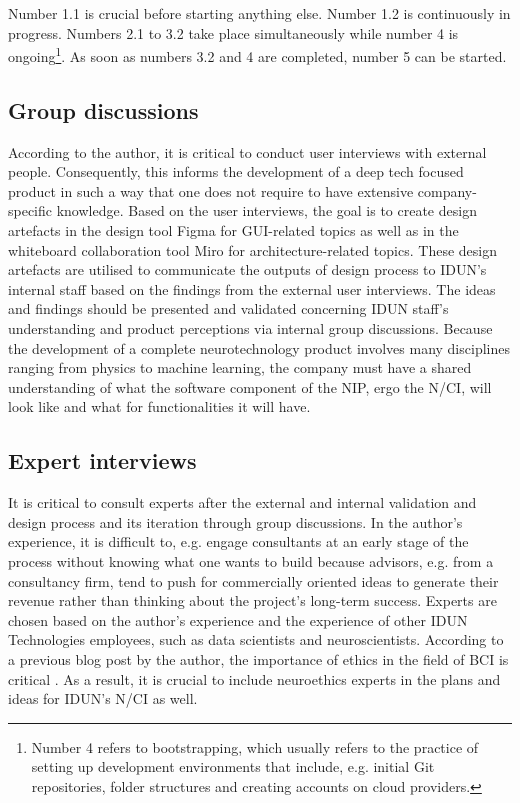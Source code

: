 Number 1.1 is crucial before starting anything else. Number 1.2 is continuously in progress. Numbers 2.1 to 3.2 take place simultaneously while number 4 is ongoing\footnote{Number 4 refers to bootstrapping, which usually refers to the practice of setting up development environments that include, e.g. initial Git repositories, folder structures and creating accounts on cloud providers.}. As soon as numbers 3.2 and 4 are completed, number 5 can be started.

\subsection{Group discussions}
\label{chapter3-group-discussions}

According to the author, it is critical to conduct user interviews with external people. Consequently, this informs the development of a deep tech focused product in such a way that one does not require to have extensive company-specific knowledge. Based on the user interviews, the goal is to create design artefacts in the design tool Figma for GUI-related topics as well as in the whiteboard collaboration tool Miro for architecture-related topics. These design artefacts are utilised to communicate the outputs of design process to IDUN's internal staff based on the findings from the external user interviews. The ideas and findings should be presented and validated concerning IDUN staff's understanding and product perceptions via internal group discussions. Because the development of a complete neurotechnology product involves many disciplines ranging from physics to machine learning, the company must have a shared understanding of what the software component of the NIP, ergo the N/CI, will look like and what for functionalities it will have.

\subsection{Expert interviews}
\label{chapter3-expert-interviews}

It is critical to consult experts after the external and internal validation and design process and its iteration through group discussions. In the author's experience, it is difficult to, e.g. engage consultants at an early stage of the process without knowing what one wants to build because advisors, e.g. from a consultancy firm, tend to push for commercially oriented ideas to generate their revenue rather than thinking about the project's long-term success. Experts are chosen based on the author's experience and the experience of other IDUN Technologies employees, such as data scientists and neuroscientists. According to a previous blog post by the author, the importance of ethics in the field of BCI is critical \citep{burger_influence_2021}. As a result, it is crucial to include neuroethics experts in the plans and ideas for IDUN's N/CI as well.

